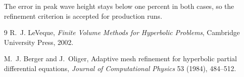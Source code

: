 The error in peak wave height stays below one percent in both cases, so
the refinement criterion is accepted for production runs.

\begin{thebibliography}{9}
R.~J. LeVeque, \emph{Finite Volume Methods for Hyperbolic Problems},
Cambridge University Press, 2002.

M.~J. Berger and J.~Oliger, Adaptive mesh refinement for hyperbolic
partial differential equations, \emph{Journal of Computational Physics}
53 (1984), 484--512.
\end{thebibliography}


